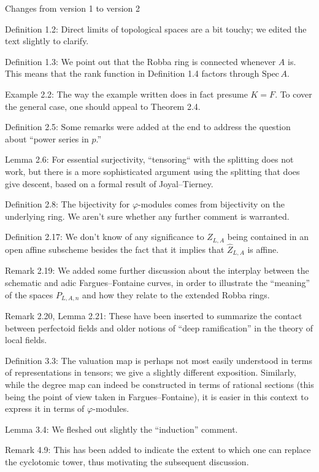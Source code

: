\documentclass[12pt]{amsart}
\begin{document}
\begin{center}
Changes from version 1 to version 2
\end{center}

Definition 1.2: Direct limits of topological spaces are a bit touchy; we edited the text slightly to clarify.

Definition 1.3: We point out that the Robba ring is connected whenever $A$ is. This means that the rank function in Definition 1.4 factors through $\mathrm{Spec}\, A$.

Example 2.2: The way the example written does in fact presume $K = F$. To cover the general case, one should appeal to Theorem 2.4.

Definition 2.5: Some remarks were added at the end to address the question about ``power series in $p$.''

Lemma 2.6: For essential surjectivity, ``tensoring`` with the splitting does not work, but there is a more sophisticated argument using the splitting that does give descent, based on a formal result of Joyal--Tierney.

Definition 2.8: The bijectivity for $\varphi$-modules comes from bijectivity on the underlying ring. We aren't sure whether any further comment is warranted.

Definition 2.17: We don't know of any significance to $Z_{L,A}$ being contained in an open affine subscheme besides the fact that it implies that $\widehat{Z}_{L,A}$ is affine.

Remark 2.19: We added some further discussion about the interplay between the schematic and adic Fargues--Fontaine curves, in order to illustrate the ``meaning'' of the spaces $P_{L,A,n}$ and how they relate to the extended Robba rings.

Remark 2.20, Lemma 2.21: These have been inserted to summarize the contact between perfectoid fields and older notions of ``deep ramification'' in the theory of local fields.

Definition 3.3: The valuation map is perhaps not most easily understood in terms of representations in tensors; we give a slightly different exposition. Similarly, while the degree map can indeed be constructed in terms of rational sections (this being the point of view taken in Fargues--Fontaine), it is easier in this context to express it in terms of $\varphi$-modules.

Lemma 3.4: We fleshed out slightly the ``induction'' comment.

Remark 4.9: This has been added to indicate the extent to which one can replace the cyclotomic tower, thus motivating the subsequent discussion.
\end{document}

